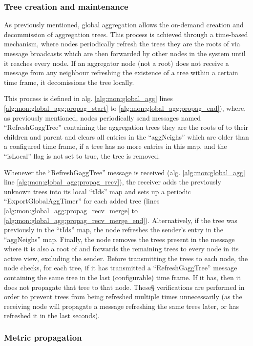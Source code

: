 \subsubsection{Tree creation and maintenance}

As previously mentioned, global aggregation allows the on-demand creation and decommission of aggregation trees. This process is achieved through a time-based mechanism, where nodes periodically refresh the trees they are the roots of via message broadcasts which are then forwarded by other nodes in the system until it reaches every node. If an aggregator node (not a root) does not receive a message from any neighbour refreshing the existence of a tree within a certain time frame, it decomissions the tree locally. 

This process is defined in alg. \ref{alg:mon:global_agg} lines \ref{alg:mon:global_agg:propag_start} to \ref{alg:mon:global_agg:propag_end}), where, as previously mentioned, nodes periodically send messages named ``RefreshGaggTree'' containing the aggregation trees they are the roots of to their children and parent and clears all entries in the ``aggNeighs'' which are older than a configured time frame, if a tree has no more entries in this map, and the ``isLocal'' flag is not set to true, the tree is removed.

Whenever the ``RefreshGaggTree'' message is received (alg. \ref{alg:mon:global_agg} line \ref{alg:mon:global_agg:propag_recv}), the receiver adds the previously unknown trees into its local ``tIds'' map and sets up a periodic ``ExportGlobalAggTimer'' for each added tree (lines \ref{alg:mon:global_agg:propag_recv_merge} to \ref{alg:mon:global_agg:propag_recv_merge_end}). Alternatively, if the tree was previously in the ``tIds'' map, the node refreshes the sender's entry in the ``aggNeighs'' map. Finally, the node removes the trees present in the message where it is also a root of and forwards the remaining trees to every node in its active view, excluding the sender. Before transmitting the trees to each node, the node checks, for each tree, if it has transmitted a ``RefreshGaggTree'' message containing the same tree in the last (configurable) time frame. If it has, then it does not propagate that tree to that node. These§ verifications are performed in order to prevent trees from being refreshed multiple times unnecessarily (as the receiving node will propagate a message refreshing the same trees later, or has refreshed it in the last seconds). 

\subsubsection{Metric propagation}

